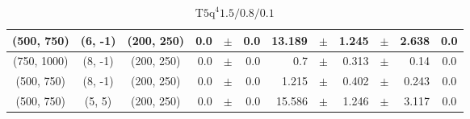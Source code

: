 \documentclass[12pt]{paper}
\newcommand{\TFiveqqqqHL}{\ensuremath{\textrm{T5q}^{4} 1.5/0.8/0.1}\xspace}
\begin{document}
\begin{table}[ht]
\begin{center}
{\begin{tabular}{|c|c|c|rrr|rrrrr|c|}
(500, 750)&(6, -1)&(200, 250)&0.0&$\pm$&0.0&13.189&$\pm$&1.245&$\pm$&2.638&0.0\\\hline
(750, 1000)&(8, -1)&(200, 250)&0.0&$\pm$&0.0&0.7&$\pm$&0.313&$\pm$&0.14&0.0\\\hline
(500, 750)&(8, -1)&(200, 250)&0.0&$\pm$&0.0&1.215&$\pm$&0.402&$\pm$&0.243&0.0\\\hline
(500, 750)&(5, 5)&(200, 250)&0.0&$\pm$&0.0&15.586&$\pm$&1.246&$\pm$&3.117&0.0\\\hline
\end{tabular}}\end{center}\caption{\TFiveqqqqHL}\end{table}
\end{document}

